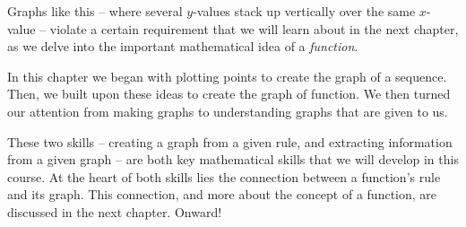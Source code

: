 Graphs like this -- where several $y$-values stack up vertically over the same $x$-value -- violate a certain requirement that we will learn about in the next chapter, as we delve into the important mathematical idea of a \textit{function}.

\chaptersummary

In this chapter we began with plotting points to create the graph of a sequence. Then, we built upon these ideas to create the graph of function. We then turned our attention from making graphs to understanding graphs that are given to us.

These two skills -- creating a graph from a given rule, and extracting information from a given graph -- are both key mathematical skills that we will develop in this course. At the heart of both skills lies the connection between a function's rule and its graph. This connection, and more about the concept of a function, are discussed in the next chapter. Onward!